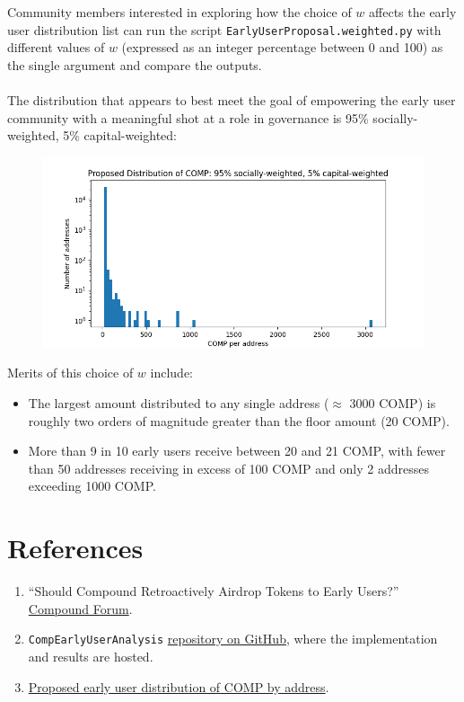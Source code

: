 \documentclass[12pt]{article}
\begin{document}
Community members interested in exploring how the choice of $w$ affects the
early user distribution list can run the script \texttt{EarlyUserProposal.weighted.py}
with different values of $w$ (expressed as an integer percentage between 0 and 100)
as the single argument and compare the outputs.
\\\\
The distribution that appears to best meet the goal of empowering the
early user community with a meaningful shot at a role in governance is
95\% socially-weighted, 5\% capital-weighted:

\begin{figure}
 \centering
 \includegraphics[width=5in]{proposals/Proposal.png}
\end{figure}

Merits of this choice of $w$ include:
\begin{itemize}
  \item{The largest amount distributed to any single address ($\approx$ 3000 COMP) is roughly two orders of magnitude greater than the floor amount (20 COMP).}
  \item{More than 9 in 10 early users receive between 20 and 21 COMP, with fewer than 50 addresses receiving in excess of 100 COMP and only 2 addresses exceeding 1000 COMP.}
\end{itemize}

\section{References}
\begin{enumerate}
  \item{``Should Compound Retroactively Airdrop Tokens to Early Users?'' \href{https://www.comp.xyz/t/should-compound-retroactively-airdrop-tokens-to-early-users/595}{Compound Forum}.}
  \item{\texttt{CompEarlyUserAnalysis} \href{https://github.com/0xA1176ec01045/CompEarlyUserAnalysis}{repository on GitHub}, where the implementation and results are hosted.}
  \item{\href{https://raw.githubusercontent.com/0xA1176ec01045/CompEarlyUserAnalysis/main/proposals/Proposal.95-5.csv}{Proposed early user distribution of COMP by address}.}
\end{enumerate}
\end{document}
